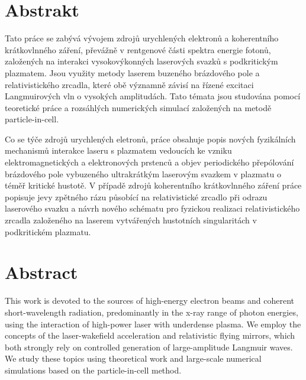 \documentclass[10pt, a4paper, twoside, openright]{report}
\begin{document}




\chapter*{Abstrakt}
\thispagestyle{empty}

Tato práce se zabývá vývojem zdrojů urychlených elektronů a koherentního krátkovlnného záření, převážně v rentgenové části spektra energie fotonů, založených na interakci vysokovýkonných laserových svazků s podkritickým plazmatem. Jsou využity metody laserem buzeného brázdového pole a relativistického zrcadla, které obě významně závisí na řízené excitaci Langmuirových vln o vysokých amplitudách. Tato témata jsou studována pomocí teoretické práce a rozsáhlých numerických simulací založených na metodě particle-in-cell.

Co se týče zdrojů urychlených eletronů, práce obsahuje popis nových fyzikálních mechanismů interakce laseru s plazmatem vedoucích ke vzniku elektromagnetických a elektronových prstenců a objev periodického přepólování brázdového pole vybuzeného ultrakrátkým laserovým svazkem v plazmatu o téměř kritické hustotě. V případě zdrojů koherentního krátkovlnného záření práce popisuje jevy zpětného rázu působící na relativistické zrcadlo při odrazu laserového svazku a návrh nového schématu pro fyzickou realizaci relativistického zrcadla založeného na laserem vytvářených hustotních singularitách v podkritickém plazmatu.

{\let\clearpage\relax\chapter*{Abstract}}
\thispagestyle{empty}

\noindent This work is devoted to the sources of high-energy electron beams and coherent short-wavelength radiation, predominantly in the x-ray range of photon energies, using the interaction of high-power laser with underdense plasma. We employ the concepts of the laser-wakefield acceleration and relativistic flying mirrors, which both strongly rely on controlled generation of large-amplitude Langmuir waves. We study these topics using theoretical work and large-scale numerical simulations based on the particle-in-cell method. 
\end{document}
